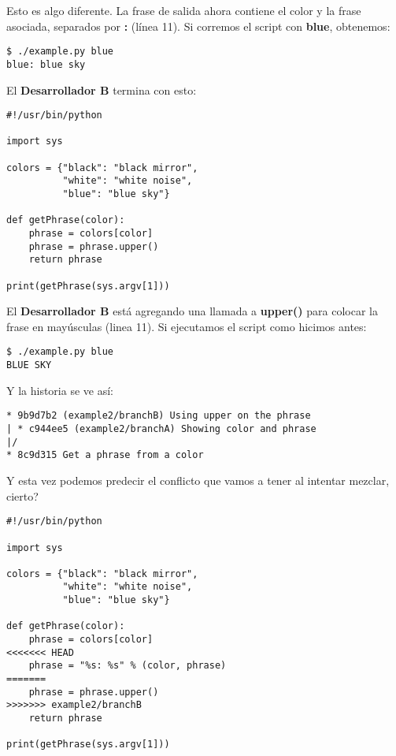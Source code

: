 Esto es algo diferente. La frase de salida ahora contiene el color y la frase asociada, separados por {\bf :} (línea 11).
Si corremos el script con {\bf blue}, obtenemos:
\begin{lstlisting}[style=console_style, caption={\bf Ejemplo 2} - Ejecutando el script del Desarrollador A]
$ ./example.py blue
blue: blue sky
\end{lstlisting}

El {\bf Desarrollador B} termina con esto:
\begin{lstlisting}[style=python_style, caption={\bf Ejemplo 2} - Desarrollador B]
#!/usr/bin/python

import sys

colors = {"black": "black mirror",
          "white": "white noise",
          "blue": "blue sky"}

def getPhrase(color):
    phrase = colors[color]
    phrase = phrase.upper()
    return phrase

print(getPhrase(sys.argv[1]))
\end{lstlisting}

El {\bf Desarrollador B} está agregando una llamada a {\bf upper()} para colocar la frase en mayúsculas (linea 11). Si ejecutamos el
script como hicimos antes:
\begin{lstlisting}[style=console_style, caption={\bf Ejemplo 2} - ejecutando el script del Desarrollador B]
$ ./example.py blue
BLUE SKY
\end{lstlisting}

Y la historia se ve así:
\begin{lstlisting}[style=console_style, caption={\bf Ejemplo 2} - historia de las ramas]
* 9b9d7b2 (example2/branchB) Using upper on the phrase
| * c944ee5 (example2/branchA) Showing color and phrase
|/  
* 8c9d315 Get a phrase from a color
\end{lstlisting}

Y esta vez podemos predecir el conflicto que vamos a tener al intentar mezclar, cierto?
\begin{lstlisting}[style=python_style, caption={\bf Ejemplo 2} - Archivo en conflicto]
#!/usr/bin/python

import sys

colors = {"black": "black mirror",
          "white": "white noise",
          "blue": "blue sky"}

def getPhrase(color):
    phrase = colors[color]
<<<<<<< HEAD
    phrase = "%s: %s" % (color, phrase)
=======
    phrase = phrase.upper()
>>>>>>> example2/branchB
    return phrase

print(getPhrase(sys.argv[1]))
\end{lstlisting}

